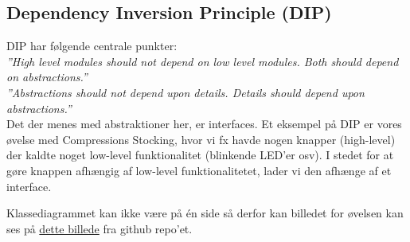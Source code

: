 \subsection{Dependency Inversion Principle (DIP)}
DIP har følgende centrale punkter:\\

\textit{''High level modules should not depend on low level modules. Both should depend on abstractions.''}\\

\textit{''Abstractions should not depend upon details. Details should depend upon abstractions.''}\\

Det der menes med abstraktioner her, er interfaces. Et eksempel på DIP er vores øvelse med Compressions Stocking, hvor vi fx havde nogen knapper (high-level) der kaldte noget low-level funktionalitet (blinkende LED’er osv). I stedet for at gøre knappen afhængig af low-level funktionalitetet, lader vi den afhænge af et interface. 

Klassediagrammet kan ikke være på én side så derfor kan billedet for øvelsen kan ses på  \href{https://raw.githubusercontent.com/BjornNorgaard/I4SWD/bdd4a11a87f182d81b3ed81409a2052e45be82c3/Eksamen/Disposition/figs/compressionstockings_classdiagram.PNG}{dette billede} fra github repo'et.